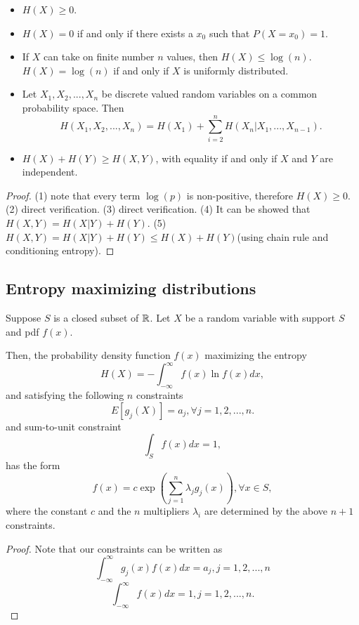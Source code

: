 \begin{refsection}
\begin{lemma}\hfill
	\begin{itemize}
		\item $H(X) \geq 0$.
		\item $H(X) = 0$ if and only if there exists a $x_0$ such that $P(X=x_0) = 1$.
		\item If $X$ can take on finite number $n$ values, then $H(X) \leq \log(n)$. $H(X) = \log(n)$ if and only if $X$ is uniformly distributed. 
		\item Let $X_1,X_2,...,X_n$ be discrete valued random variables on a common probability space. Then
		$$H(X_1,X_2,...,X_n) = H(X_1) + \sum_{i=2}^n H(X_n|X_1,...,X_{n-1}).$$
		\item $H(X) + H(Y) \geq H(X,Y)$, with equality if and only if $X$ and $Y$ are independent.
	\end{itemize}
\end{lemma}
\begin{proof}
	(1) note that every term $\log(p)$ is non-positive, therefore $H(X) \geq 0$. (2) direct verification. (3)  direct verification. (4) It can be showed that $H(X,Y) = H(X|Y) + H(Y)$. (5) $H(X,Y) = H(X|Y) + H(Y) \leq H(X) + H(Y)$(using chain rule and conditioning entropy). 
\end{proof}


\subsection{Entropy maximizing distributions}



\begin{theorem}\label{ch:statistical-learning:th:continuousDistributionWithMaximumEntropy}
	Suppose $S$ is a closed subset of $\mathbb{R}$. Let $X$ be a random variable with support $S$ and pdf $f(x)$.
	
	Then, the probability density function $f(x)$ maximizing the entropy
	$$H(X) = -\int_{-\infty}^{\infty} f(x)\ln f(x) dx,$$
	and satisfying the following $n$ constraints
	$$E[g_j(X)] = a_j, \forall j=1,2,...,n.$$
	and sum-to-unit constraint
	$$\int_S f(x) dx = 1,$$
	has the form
	$$f(x) = c\exp(\sum_{j=1}^{n} \lambda_j g_j(x)), \forall x\in S,$$
	where the constant $c$ and the $n$ multipliers $\lambda_i$ are determined by the above $n+1$ constraints.
\end{theorem}
\begin{proof}
	Note that our constraints can be written as
	$$\int_{-\infty}^{\infty} g_j(x)f(x) dx = a_j,j = 1,2,...,n $$	
	$$\int_{-\infty}^{\infty} f(x) dx = 1,j = 1,2,...,n.$$	
	

\end{proof}
\end{refsection}
